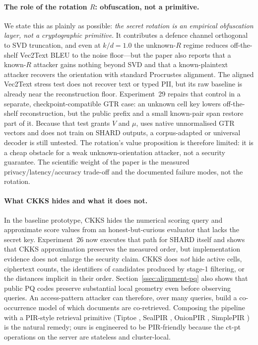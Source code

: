 \paragraph{The role of the rotation $R$: obfuscation, not a primitive.}
We state this as plainly as possible: \emph{the secret rotation is an
empirical obfuscation layer, not a cryptographic primitive}. It
contributes a defence channel orthogonal to SVD truncation, and even at
$k/d = 1.0$ the unknown-$R$ regime reduces off-the-shelf Vec2Text BLEU
to the noise floor---but the paper also reports that a known-$R$ attacker
gains nothing beyond SVD and that a known-plaintext attacker recovers the
orientation with standard Procrustes alignment. The aligned Vec2Text
stress test does not recover text or typed PII, but its raw baseline is
already near the reconstruction floor. Experiment~29 repairs that control in
a separate, checkpoint-compatible GTR case: an unknown cell key lowers
off-the-shelf reconstruction, but the public prefix and a small known-pair span
restore part of it. Because that test grants $V$ and $\mu$, uses native
unnormalised GTR vectors and does not train on SHARD outputs, a corpus-adapted
or universal decoder is still untested. The rotation's value proposition is
therefore limited: it is a cheap obstacle
for a weak unknown-orientation attacker, not a security guarantee. The
scientific weight of the paper is the measured privacy/latency/accuracy
trade-off and the documented failure modes, not the rotation.

\paragraph{What CKKS hides and what it does not.} In the baseline prototype,
CKKS hides the numerical scoring query and approximate score values from an
honest-but-curious evaluator that lacks the secret key. Experiment~26 now
executes that path for SHARD itself and shows that CKKS approximation preserves
the measured order, but implementation evidence does not enlarge the security
claim. CKKS does \emph{not} hide active cells, ciphertext counts, the
identifiers of candidates produced by stage-1 filtering, or the distances
implicit in their order. Section~\ref{ssec:alignment-pq} also shows that public PQ
codes preserve substantial local geometry even before observing queries.
An access-pattern attacker can therefore, over many queries, build a
co-occurrence model of which documents are co-retrieved.
Composing the pipeline with a PIR-style retrieval primitive (Tiptoe
\cite{ref_tiptoe}, SealPIR \cite{ref_sealpir}, OnionPIR
\cite{ref_onionpir}, SimplePIR \cite{ref_simplepir}) is the natural
remedy; ours is engineered to be PIR-friendly because the
ct-pt operations on the server are stateless and cluster-local.

